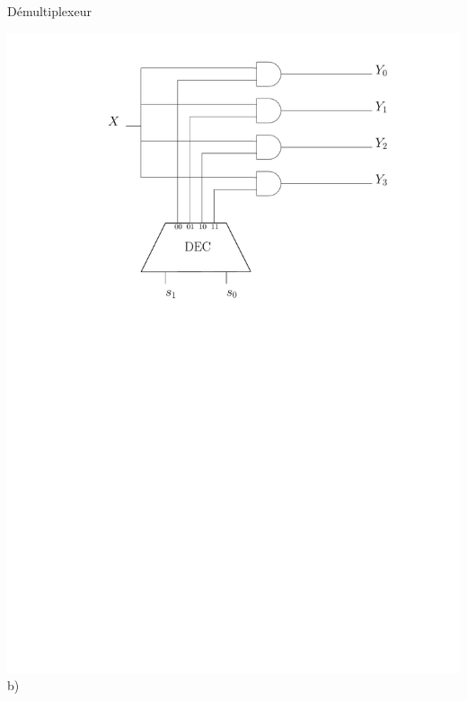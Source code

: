 \documentclass{beamer}
\begin{document}
\begin{frame}
\begin{block}{Démultiplexeur}
\begin{minipage}[c]{.46\linewidth}
\includegraphics[width=\linewidth]{Figs/demux_inner.pdf}\\\centering b)
\end{minipage}
\end{block}
\end{frame}
\end{document}
